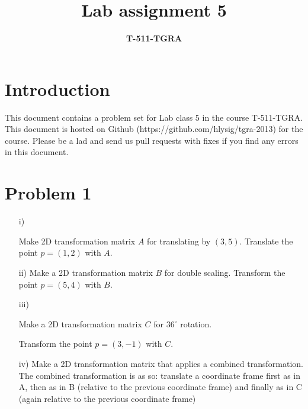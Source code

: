 \documentclass[12pt]{article}
\title{\textbf{Lab assignment 5}}
\author{\textbf{T-511-TGRA}}
\date{}
\begin{document}
\maketitle
\section*{Introduction}
This document contains a problem set for Lab class 5 in the course T-511-TGRA.
This document is hosted on Github (https://github.com/hlysig/tgra-2013) for the course. Please be a lad and send us pull requests with fixes if you find any errors in this document.

\section*{Problem 1}
\begin{itemize}
    \item[i)] {
    Make 2D transformation matrix $A$ for translating by $(3,5)$. 
     Translate the point $p=(1,2)$ with $A$.
   
    }
    \item[ii)] {
    Make a 2D transformation matrix $B$ for double scaling.
    Transform the point $p=(5,4)$ with $B$.
    }
    \item[iii)] {
        Make a 2D transformation matrix $C$ for $36^\circ$ rotation.

        Transform the point $p=(3,-1)$ with $C$.
           }
    \item[iv)]{
    Make a 2D transformation matrix that applies a combined transformation. The
    combined transformation is as so: translate a coordinate frame first as in
    A, then as in B (relative to the previous coordinate frame) and finally as
    in C (again relative to the previous coordinate frame)
    }
  \end{itemize}

\end{document}
